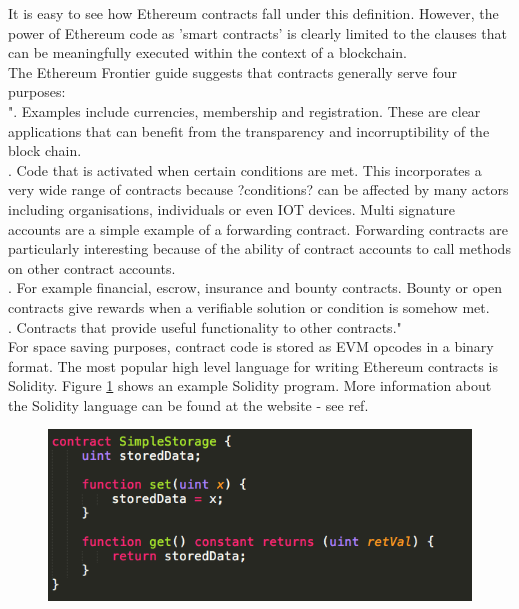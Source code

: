 It is easy to see how Ethereum contracts fall under this definition. However, the power of Ethereum code as 'smart contracts' is clearly limited to the clauses that can be meaningfully executed within the context of a blockchain.\\

The Ethereum Frontier guide\cite{Contracts_guide} suggests that contracts generally serve four purposes: \\

". Examples include currencies, membership and registration. These are clear applications that can benefit from the transparency and incorruptibility of the block chain.\\


. Code that is activated when certain conditions are met. This incorporates a very wide range of contracts because ?conditions? can be affected by many actors including organisations, individuals or even IOT devices. Multi signature accounts are a simple example of a forwarding contract. Forwarding contracts are particularly interesting because of the ability of contract accounts to call methods on other contract accounts.\\


. For example financial, escrow, insurance and bounty contracts. Bounty or open contracts give rewards when a verifiable solution or condition is somehow met. \\


. Contracts that provide useful functionality to other contracts."\\


For space saving purposes, contract code is stored as EVM opcodes in a binary format. The most popular high level language for writing Ethereum contracts is Solidity\cite{Solidity}. Figure \ref{fig:Simplestorage} shows an example Solidity program. More information about the Solidity language can be found at the website - see ref.\\

\begin{figure}
\centering
\includegraphics[width=\textwidth]{Figures/Simplestorage}
\decoRule
\caption[]{}
\label{fig:Simplestorage}
\end{figure}


